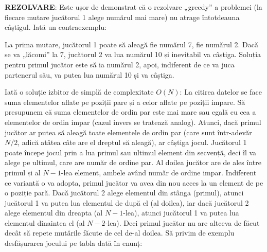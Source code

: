 {\bf REZOLVARE}: Este ușor de demonstrat că o rezolvare „greedy” a problemei
(la fiecare mutare jucătorul 1 alege numărul mai mare) nu atrage întotdeauna
câștigul. Iată un contraexemplu:


La prima mutare, jucătorul 1 poate să aleagă fie numărul 7, fie numărul
2. Dacă se va „lăcomi” la 7, jucătorul 2 va lua numărul 10 și inevitabil va
câștiga. Soluția pentru primul jucător este să ia numărul 2, apoi, indiferent
de ce va juca partenerul său, va putea lua numărul 10 și va câștiga.

Iată o soluție izbitor de simplă de complexitate $O(N)$: La citirea datelor se
face suma elementelor aflate pe poziții pare și a celor aflate pe poziții
impare. Să presupunem că suma elementelor de ordin par este mai mare sau egală
cu cea a elementelor de ordin impar (cazul invers se tratează analog). Atunci,
dacă primul jucător ar putea să aleagă toate elementele de ordin par (care
sunt într-adevăr $N/2$, adică atâtea câte are el dreptul să aleagă), ar
câștiga jocul. Jucătorul 1 poate începe jocul prin a lua primul sau ultimul
element din secvență, deci îl va alege pe ultimul, care are număr de ordine
par. Al doilea jucător are de ales între primul și al $N-1$-lea element,
ambele având număr de ordine impar. Indiferent ce variantă o va adopta, primul
jucător va avea din nou acces la un element de pe o poziție pară. Dacă
jucătorul 2 alege elementul din stânga (primul), atunci jucătorul 1 va putea
lua elementul de după el (al doilea), iar dacă jucătorul 2 alege elementul din
dreapta (al $N-1$-lea), atunci jucătorul 1 va putea lua elementul dinaintea el
(al $N-2$-lea). Deci primul jucător nu are altceva de făcut decât să repete
mutările făcute de cel de-al doilea. Să privim de exemplu desfășurarea jocului
pe tabla dată în enunț:

